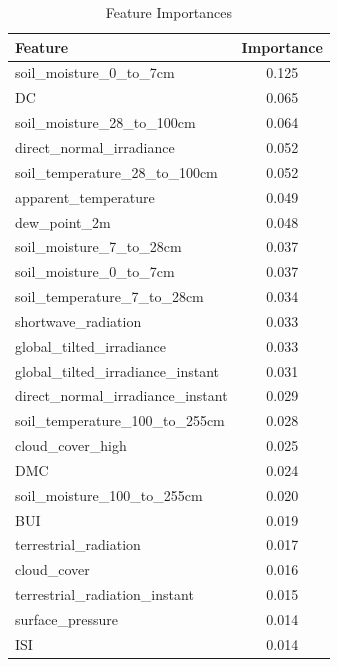 \begin{table}[H]
	\caption{Feature Importances}
	\centering
	\label{feature_importances}
	\begin{tabular}{lc}
		\hline
		Feature                                & Importance \\ \hline
		soil\_moisture\_0\_to\_7cm            & 0.125       \\ 
		DC                                     & 0.065       \\ 
		soil\_moisture\_28\_to\_100cm         & 0.064       \\ 
		direct\_normal\_irradiance             & 0.052       \\ 
		soil\_temperature\_28\_to\_100cm       & 0.052       \\ 
		apparent\_temperature                 & 0.049       \\ 
		dew\_point\_2m                         & 0.048       \\ 
		soil\_moisture\_7\_to\_28cm            & 0.037       \\ 
		soil\_moisture\_0\_to\_7cm             & 0.037       \\ 
		soil\_temperature\_7\_to\_28cm         & 0.034       \\ 
		shortwave\_radiation                   & 0.033       \\ 
		global\_tilted\_irradiance             & 0.033       \\ 
		global\_tilted\_irradiance\_instant    & 0.031       \\ 
		direct\_normal\_irradiance\_instant    & 0.029       \\ 
		soil\_temperature\_100\_to\_255cm       & 0.028       \\ 
		cloud\_cover\_high                      & 0.025       \\ 
		DMC                                      & 0.024       \\ 
		soil\_moisture\_100\_to\_255cm          & 0.020       \\ 
		BUI                                      & 0.019       \\ 
		terrestrial\_radiation                  & 0.017       \\ 
		cloud\_cover                            & 0.016       \\ 
		terrestrial\_radiation\_instant         & 0.015       \\ 
		surface\_pressure                       & 0.014       \\ 
		ISI                                      & 0.014       \\ 

\end{tabular}
\end{table}
